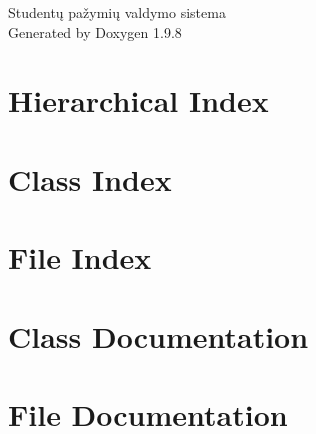 \documentclass[twoside]{book}
\newcommand{\+}{\discretionary{\mbox{\scriptsize$\hookleftarrow$}}{}{}}
\newcommand{\clearemptydoublepage}{%
    \newpage{\pagestyle{empty}\cleardoublepage}%
  }
\begin{document}
  \raggedbottom
    \hypersetup{pageanchor=false,
                bookmarksnumbered=true,
                pdfencoding=unicode
               }
  \begin{titlepage}
  \vspace*{7cm}
  \begin{center}%
  {\Large Studentų pažymių valdymo sistema}\\
  \vspace*{1cm}
  {\large Generated by Doxygen 1.9.8}\\
  \end{center}
  \end{titlepage}
  \clearemptydoublepage
  \tableofcontents
  \clearemptydoublepage
  \hypersetup{pageanchor=true}


\chapter{Hierarchical Index}

\chapter{Class Index}

\chapter{File Index}

\chapter{Class Documentation}


\chapter{File Documentation}














  \backmatter
  \newpage
  \clearemptydoublepage
  \printindex
\end{document}
